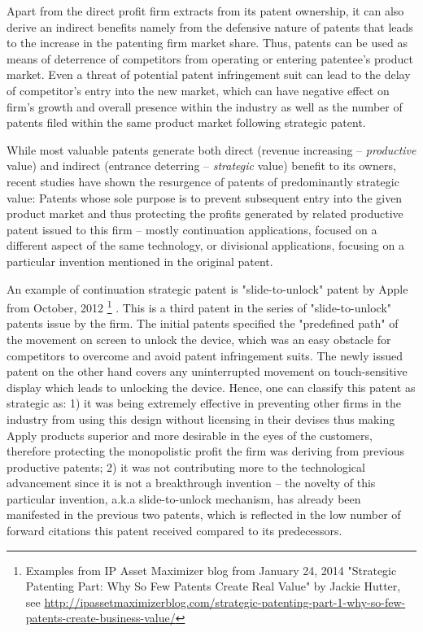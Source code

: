 \documentclass[11pt]{article}
\begin{document}
Apart from the direct profit firm extracts from its patent ownership, it can also derive an indirect benefits namely from the defensive nature of patents that leads to the increase in the patenting firm market share. Thus, patents can be used as means of deterrence of competitors from operating or entering patentee's product market. Even a threat of potential patent infringement suit can lead to the delay of competitor's entry into the new market, which can have negative effect on firm's growth and overall presence within the industry as well as the number of patents filed within the same product market following strategic patent.

While most valuable patents generate both direct (revenue increasing -- \textit{productive} value) and indirect (entrance deterring -- \textit{strategic} value) benefit to its owners, recent studies have shown the resurgence of patents of predominantly strategic value: Patents whose sole purpose is to prevent subsequent entry into the given product market and thus protecting the profits generated by related productive patent issued to this firm -- mostly continuation applications, focused on a different aspect of the same technology, or divisional applications, focusing on a particular invention mentioned in the original patent. 

An example of continuation strategic patent is "slide-to-unlock" patent by Apple from October, 2012 \footnote{Examples from IP Asset Maximizer blog from January 24, 2014 "Strategic Patenting Part: Why So Few Patents Create Real Value" by Jackie Hutter, see \url{http://ipassetmaximizerblog.com/strategic-patenting-part-1-why-so-few-patents-create-business-value/}} . This is a third patent in the series of "slide-to-unlock" patents issue by the firm. The initial patents specified the "predefined path" of the movement on screen to unlock the device, which was an easy obstacle for competitors to overcome and avoid patent infringement suits. The newly issued patent on the other hand covers any uninterrupted movement on touch-sensitive display which leads to unlocking the device. Hence, one can classify this patent as strategic as: 1) it was being extremely effective in preventing other firms in the industry from using this design without licensing in their devises thus making Apply products superior and more desirable in the eyes of the customers, therefore protecting the monopolistic profit the firm was deriving from previous
productive patents; 2) it was not contributing more to the technological advancement since it is not a breakthrough invention -- the novelty of this particular invention, a.k.a slide-to-unlock mechanism, has already been manifested in the previous two patents, which is reflected in the low number of forward citations this patent received compared to its predecessors.
\end{document}
